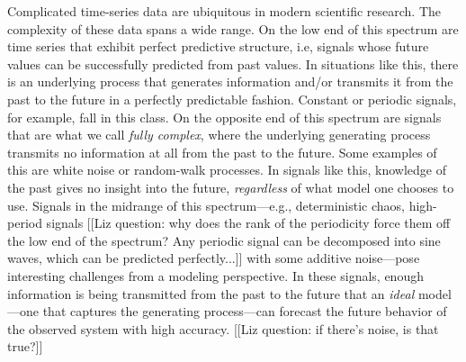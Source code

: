 



%

Complicated time-series data are ubiquitous in modern scientific
research.  The complexity of these data spans a wide range.  On the
low end of this spectrum are time series that exhibit perfect
predictive structure, i.e, signals whose future values can be
successfully predicted from past values.  In situations like this,
there is an underlying process that generates information and/or
transmits it from the past to the future in a perfectly predictable
fashion.  Constant or periodic signals, for example, fall in this
class.  On the opposite end of this spectrum are signals that are what
we call \emph{fully complex}, where the underlying generating process
transmits no information at all from the past to the future.  Some
examples of this are white noise or random-walk processes.  In signals
like this, knowledge of the past gives no insight into the future,
\emph{regardless} of what model one chooses to use.  Signals in the
midrange of this spectrum---e.g., deterministic chaos, high-period
signals [[Liz question: why does the rank of the periodicity force
    them off the low end of the spectrum?  Any periodic signal can be
    decomposed into sine waves, which can be predicted perfectly...]]
with some additive noise---pose interesting challenges from a modeling
perspective.  In these signals, enough information is being
transmitted from the past to the future that an \emph{ideal}
model---one that captures the generating process---can forecast the
future behavior of the observed system with high accuracy.  [[Liz
    question: if there's noise, is that true?]]

